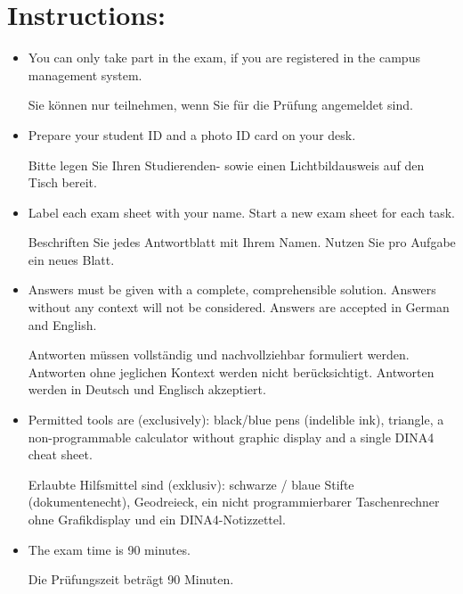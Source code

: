 \section*{\hspace*{2mm}Instructions:}
\begin{itemize}
\item You can only take part in the exam, if you are registered in the campus management system.

\begin{germanblock}
    Sie können nur teilnehmen, wenn Sie für die Prüfung angemeldet sind.
\end{germanblock}
\item Prepare your student ID and a photo ID card on your desk.

\begin{germanblock}
    Bitte legen Sie Ihren Studierenden- sowie einen Lichtbildausweis auf den Tisch bereit.
\end{germanblock}
\item Label each exam sheet with your name. Start a new exam sheet for each task. 

\begin{germanblock}
    Beschriften Sie jedes Antwortblatt mit Ihrem Namen. Nutzen Sie pro  Aufgabe ein neues Blatt.
\end{germanblock}
\item Answers must be given with a complete, comprehensible solution. Answers without any context will not be considered. Answers are accepted in German and English.

\begin{germanblock}
    Antworten müssen vollständig und nachvollziehbar formuliert werden. Antworten ohne jeglichen Kontext werden nicht berücksichtigt. Antworten werden in Deutsch und Englisch akzeptiert.
\end{germanblock}
\item Permitted tools are (exclusively): black/blue pens (indelible ink), triangle, a non-programmable calculator without graphic display and a single DINA4 cheat sheet.

\begin{germanblock}
    Erlaubte Hilfsmittel sind (exklusiv): schwarze / blaue Stifte (dokumentenecht), Geodreieck, ein nicht programmierbarer Taschenrechner ohne Grafikdisplay und ein DINA4-Notizzettel.
\end{germanblock}
\item The exam time is 90 minutes.

\begin{germanblock}
    Die Prüfungszeit beträgt 90 Minuten.
\end{germanblock} 
\end{itemize}

